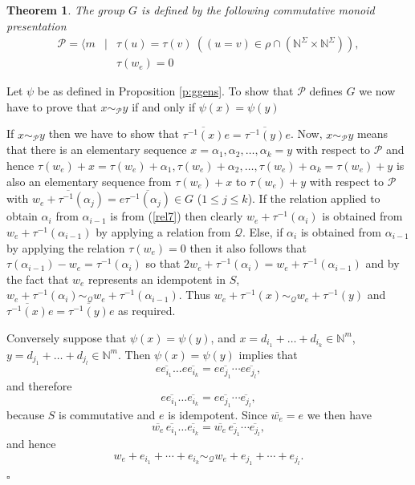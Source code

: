 \documentclass[12pt]{article}
\newtheorem{theorem}{\qquad\bf Theorem}
\newenvironment{proof}{{\it Proof.\/}}{$\square$\\}
\begin{document}
\begin{theorem} \label{T:maxgroup}
The group $G$ is defined by the following 
commutative monoid presentation
\begin{eqnarray}
\label{rel7}\mathcal{P}=\langle m&\mid&
\tau(u)=\tau(v)\ 
((u=v)\in \rho\cap(\mathbb{N}^{\Sigma}\!\times\mathbb{N}^{\Sigma})),\\
\label{rel8}&&\tau(w_e)=0 
\end{eqnarray}
\end{theorem}

\begin{proof}
Let $\psi$ be as defined in Proposition \ref{p:ggens}.
To show that $\mathcal{P}$ defines $G$ we now have to prove
that $x\sim_{\mathcal{P}}y$ if and only if $\psi(x)=\psi(y)$ 

If $x\sim_{\mathcal{P}}y$ then we have to show that
$\overline{\tau^{-1}(x)}e=\overline{\tau^{-1}(y)}e$.
Now, $x\sim_{\mathcal{P}}y$
means that there is an elementary sequence $x=\alpha_1,\alpha_2,
\ldots,\alpha_k=y$ with respect to $\mathcal{P}$ and hence
$\tau(w_e)+x=\tau(w_e)+\alpha_1,\tau(w_e)+\alpha_2,\ldots,
\tau(w_e)+\alpha_k=\tau(w_e)+y$ is also an elementary sequence from 
$\tau(w_e)+x$ to $\tau(w_e)+y$ with respect to $\mathcal{P}$ with 
$\overline{w_e+\tau^{-1}(\alpha_j)}=e\overline{\tau^{-1}(\alpha_j)}\in G$ 
($1\leq j\leq k$).
If the relation applied to obtain $\alpha_i$ from $\alpha_{i-1}$
is from (\ref{rel7}) then clearly $w_e+\tau^{-1}(\alpha_i)$ is obtained
from $w_e+\tau^{-1}(\alpha_{i-1})$ by applying a relation from $\mathcal{Q}$.
Else, if $\alpha_i$ is obtained from $\alpha_{i-1}$ by applying the
relation $\tau(w_e)=0$ then it also follows that
$\tau(\alpha_{i-1}) - w_e = \tau^{-1}(\alpha_i)$ so that
$2w_e+\tau^{-1}(\alpha_i) = w_e+\tau^{-1}(\alpha_{i-1})$ and by the fact that
$w_e$ represents an idempotent in $S$,
$w_e+\tau^{-1}(\alpha_i)
\sim_{\mathcal{Q}}w_e+\tau^{-1}(\alpha_{i-1})$. 
Thus $w_e+\tau^{-1}(x)\sim_{\mathcal{Q}}w_e+\tau^{-1}(y)$ and
$\overline{\tau^{-1}(x)}e=\overline{\tau^{-1}(y)}e$ as required. 

Conversely suppose that $\psi(x)=\psi(y)$, and 
$x=d_{i_1}+\ldots+d_{i_k}\in\mathbb{N}^m$,
$y=d_{j_1}+\ldots+d_{j_l}\in\mathbb{N}^m$.
Then $\psi(x)=\psi(y)$ implies that
$$e\overline{e_{i_1}}\ldots e\overline{e_{i_k}}=
e\overline{e_{j_1}}\cdots e\overline{e_{j_l}},$$
and therefore  
$$e\overline{e_{i_1}}\ldots\overline{e_{i_k}}=
e\overline{e_{j_1}}\cdots \overline{e_{j_l}},$$
because $S$ is commutative and $e$ is idempotent.
Since $\overline{w_e}=e$ we then have
$$\overline{w_e}\,\overline{e_{i_1}}\ldots\overline{e_{i_k}}=
\overline{w_e}\,\overline{e_{j_1}}\cdots \overline{e_{j_l}},$$
and hence 
$$w_e+e_{i_1}+\cdots+e_{i_k}\sim_{\mathcal{Q}} w_e+e_{j_1}+\cdots
+e_{j_l}.$$


\end{proof}
\end{document}
